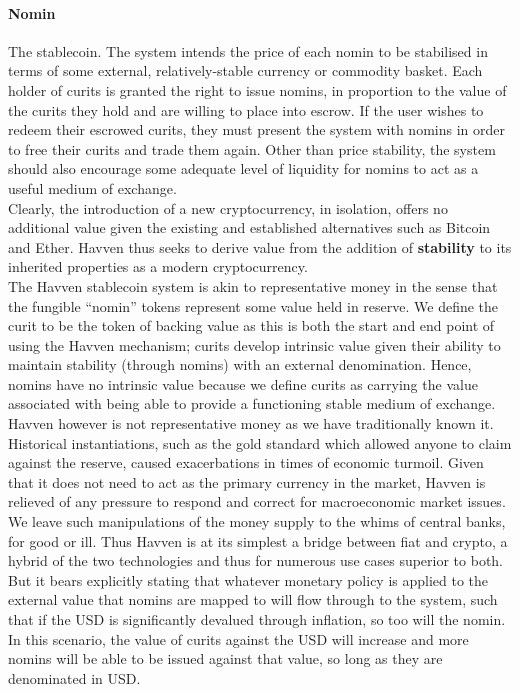 \paragraph{Nomin} The stablecoin. The system intends the price of each nomin to be stabilised in terms of some
external, relatively-stable currency or commodity basket. Each holder of curits is granted the right to issue
nomins, in proportion to the value of the curits they hold and are willing to place into escrow.
If the user wishes to redeem their escrowed curits, they must present the system with nomins in order to free
their curits and trade them again. Other than price stability, the system should also encourage some adequate
level of liquidity for nomins to act as a useful medium of exchange. \\

\noindent Clearly, the introduction of a new cryptocurrency, in isolation, offers no additional value given
the existing and established alternatives such as Bitcoin and Ether. Havven thus seeks to derive value from the
addition of \textbf{stability} to its inherited properties as a modern cryptocurrency. \\

\noindent The Havven stablecoin system is akin to representative money in the sense that the fungible ``nomin''
tokens represent some value held in reserve. We define the curit to be the token of backing value as this is
both the start and end point of using the Havven mechanism; curits develop intrinsic value given their ability
to maintain stability (through nomins) with an external denomination. Hence, nomins have no intrinsic value
because we define curits as carrying the value associated with being able to provide a functioning stable
medium of exchange. \\

\noindent Havven however is not representative money as we have traditionally known it. Historical instantiations,
such as the gold standard which allowed anyone to claim against the reserve, caused exacerbations in times of
economic turmoil. Given that it does not need to act as the primary currency in the market, Havven is relieved
of any pressure to respond and correct for macroeconomic market issues. We leave such manipulations of the money
supply to the whims of central banks, for good or ill. Thus Havven is at its simplest a bridge between fiat and
crypto, a hybrid of the two technologies and thus for numerous use cases superior to both. But it bears
explicitly stating that whatever monetary policy is applied to the external value that nomins are mapped to will
flow through to the system, such that if the USD is significantly devalued through inflation, so too will the
nomin. In this scenario, the value of curits against the USD will increase and more nomins will be able to be
issued against that value, so long as they are denominated in USD. \\

